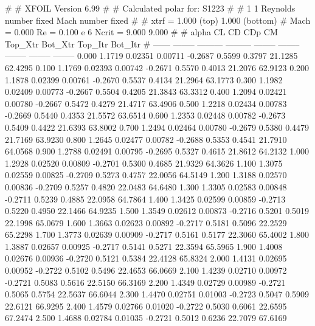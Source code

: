 #  
#       XFOIL         Version 6.99
#  
# Calculated polar for: S1223                                           
#  
# 1 1 Reynolds number fixed          Mach number fixed         
#  
# xtrf =   1.000 (top)        1.000 (bottom)  
# Mach =   0.000     Re =     0.100 e 6     Ncrit =   9.000  9.000
#  
#   alpha    CL        CD       CDp       CM     Top_Xtr  Bot_Xtr  Top_Itr  Bot_Itr
#  ------ -------- --------- --------- -------- -------- -------- -------- --------
   0.000   1.1719   0.02351   0.00711  -0.2687   0.5599   0.3797  21.1285  62.4295
   0.100   1.1769   0.02393   0.00742  -0.2671   0.5570   0.4013  21.2076  62.9123
   0.200   1.1878   0.02399   0.00761  -0.2670   0.5537   0.4134  21.2964  63.1773
   0.300   1.1982   0.02409   0.00773  -0.2667   0.5504   0.4205  21.3843  63.3312
   0.400   1.2094   0.02421   0.00780  -0.2667   0.5472   0.4279  21.4717  63.4906
   0.500   1.2218   0.02434   0.00783  -0.2669   0.5440   0.4353  21.5572  63.6514
   0.600   1.2353   0.02448   0.00782  -0.2673   0.5409   0.4422  21.6393  63.8002
   0.700   1.2494   0.02464   0.00780  -0.2679   0.5380   0.4479  21.7169  63.9230
   0.800   1.2645   0.02477   0.00782  -0.2688   0.5353   0.4541  21.7910  64.0568
   0.900   1.2788   0.02491   0.00795  -0.2695   0.5327   0.4615  21.8612  64.2132
   1.000   1.2928   0.02520   0.00809  -0.2701   0.5300   0.4685  21.9329  64.3626
   1.100   1.3075   0.02559   0.00825  -0.2709   0.5273   0.4757  22.0056  64.5149
   1.200   1.3188   0.02570   0.00836  -0.2709   0.5257   0.4820  22.0483  64.6480
   1.300   1.3305   0.02583   0.00848  -0.2711   0.5239   0.4885  22.0958  64.7864
   1.400   1.3425   0.02599   0.00859  -0.2713   0.5220   0.4950  22.1466  64.9235
   1.500   1.3549   0.02612   0.00873  -0.2716   0.5201   0.5019  22.1998  65.0679
   1.600   1.3663   0.02623   0.00892  -0.2717   0.5181   0.5096  22.2529  65.2298
   1.700   1.3773   0.02639   0.00909  -0.2717   0.5161   0.5177  22.3060  65.4002
   1.800   1.3887   0.02657   0.00925  -0.2717   0.5141   0.5271  22.3594  65.5965
   1.900   1.4008   0.02676   0.00936  -0.2720   0.5121   0.5384  22.4128  65.8324
   2.000   1.4131   0.02695   0.00952  -0.2722   0.5102   0.5496  22.4653  66.0669
   2.100   1.4239   0.02710   0.00972  -0.2721   0.5083   0.5616  22.5150  66.3169
   2.200   1.4349   0.02729   0.00989  -0.2721   0.5065   0.5754  22.5637  66.6044
   2.300   1.4470   0.02751   0.01003  -0.2723   0.5047   0.5909  22.6121  66.9295
   2.400   1.4579   0.02766   0.01020  -0.2722   0.5030   0.6061  22.6595  67.2474
   2.500   1.4688   0.02784   0.01035  -0.2721   0.5012   0.6236  22.7079  67.6169
